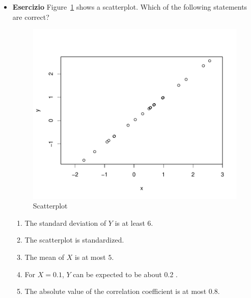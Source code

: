 \documentclass[onecolumn,12pt]{book}
\newenvironment{question}{\item \textbf{Esercizio}\newline}{}
\newenvironment{answerlist}{\renewcommand{\labelenumi}{(\alph{enumi})}\begin{enumerate}}{\end{enumerate}}
\begin{document}
\begin{itemize}
\begin{question}
  Figure~\ref{fig:scatterplot} shows a scatterplot. Which of the
  following statements are correct?

\begin{figure}[htb!]
\begin{center}
\includegraphics{RbookParte2-056}
\caption{\label{fig:scatterplot} Scatterplot}
\end{center}
\end{figure}

\begin{answerlist}
  \item The standard deviation of $Y$ is at least $6$.
  \item The scatterplot is standardized.
  \item The mean of $X$ is at most $5$.
  \item For $X =  0.1 $, $Y$ can be expected to be about  0.2 .
  \item The absolute value of the correlation coefficient is at most $0.8$.
\end{answerlist}
\end{question}


\end{itemize}
\end{document}
